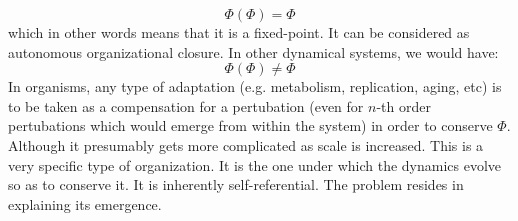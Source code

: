 \documentclass[a4paper,12pt,twoside,leqno]{article}
\begin{document}
$$
\Phi (\Phi) = \Phi
$$
which in other words means that it is a fixed-point. It can be considered as autonomous organizational closure. In other dynamical systems, we would have:
$$
\Phi (\Phi) \neq \Phi
$$
In organisms, any type of adaptation (e.g. metabolism, replication, aging, etc) is to be taken as a compensation for a pertubation (even for $n$-th order pertubations which would emerge from within the system) in order to conserve $\Phi$. Although it presumably gets more complicated as scale is increased. This is a very specific type of organization. It is the one under which the dynamics evolve so as to conserve it. It is inherently self-referential. The problem resides in explaining its emergence.
\end{document}
